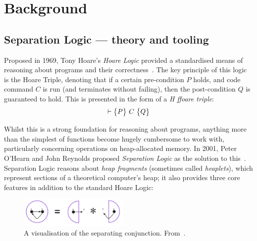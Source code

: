 
\chapter{Background}\label{sec:background}

\section{Separation Logic --- theory and tooling}\label{sec:background:sl-and-tools}

Proposed in 1969, Tony Hoare's \textit{Hoare Logic} provided a standardised
means of reasoning about programs and their correctness~\cite{hoare}. The key
principle of this logic is the Hoare Triple, denoting that if a certain
pre-condition $P$ holds, and code command $C$ is run (and terminates without
failing), then the post-condition $Q$ is guaranteed to hold. This is presented
in the form of a \textit{H ffoare triple}:
\[
  \triple{P}{C}{Q}
\]

Whilst this is a strong foundation for reasoning about programs, anything more
than the simplest of functions become hugely cumbersome to work with,
particularly concerning operations on heap-allocated memory. In 2001, Peter
O'Hearn and John Reynolds proposed \textit{Separation Logic} as the solution to
this~\cite{separation-logic}. Separation Logic reasons about
\textit{heap fragments} (sometimes called \textit{heaplets}), which represent
sections of a theoretical computer's heap; it also provides three core features
in addition to the standard Hoare Logic:

\begin{figure}[!b]
  \centering
  \includegraphics[width=200px]{img/separating-conjunction.jpg}
  \caption{
    A visualisation of the separating conjunction.
    From~\cite{infer-sl}.
  }\label{fig:separating-conjunction}
\end{figure}

